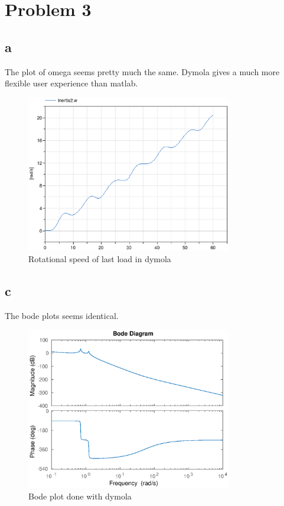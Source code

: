 \documentclass[11pt]{article}
\begin{document}
\section*{Problem 3}
\subsection*{a}
The plot of omega seems pretty much the same. Dymola gives a much more flexible user experience than matlab.
\begin{figure}[H]
\centering
\includegraphics[width=0.8\textwidth]{DymolaRotationalSpeed.eps}
\caption{Rotational speed of last load in dymola}
\end{figure}

\subsection*{c}
The bode plots seems identical.
\begin{figure}[H]
\centering
\includegraphics[width=0.8\textwidth]{dymolaBode.eps}
\caption{Bode plot done with dymola}
\end{figure}
\end{document}

